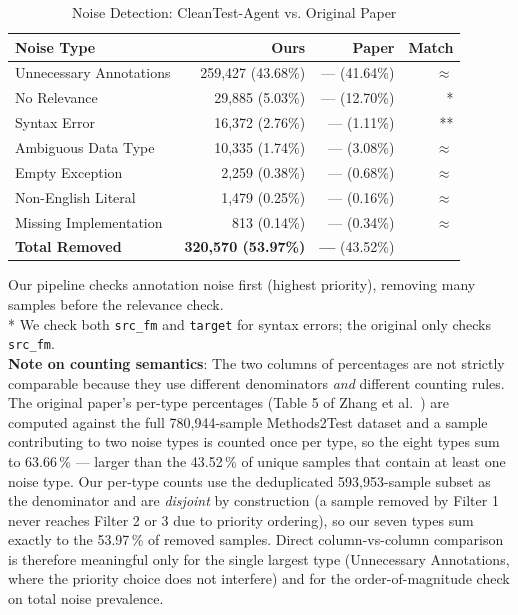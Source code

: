 \documentclass[acmlarge,nonacm,screen]{acmart}
\begin{document}
\begin{table}[H]
\caption{Noise Detection: CleanTest-Agent vs. Original Paper}
\label{tab:rq1}
\begin{tabular}{@{}lrrr@{}}
\toprule
\textbf{Noise Type} & \textbf{Ours} & \textbf{Paper} & \textbf{Match} \\
\midrule
Unnecessary Annotations & 259,427 (43.68\%) & --- (41.64\%) & $\approx$ \\
No Relevance & 29,885 (5.03\%) & --- (12.70\%) & * \\
Syntax Error & 16,372 (2.76\%) & --- (1.11\%) & ** \\
Ambiguous Data Type & 10,335 (1.74\%) & --- (3.08\%) & $\approx$ \\
Empty Exception & 2,259 (0.38\%) & --- (0.68\%) & $\approx$ \\
Non-English Literal & 1,479 (0.25\%) & --- (0.16\%) & $\approx$ \\
Missing Implementation & 813 (0.14\%) & --- (0.34\%) & $\approx$ \\
\midrule
\textbf{Total Removed} & \textbf{320,570 (53.97\%)} & \textbf{---} (43.52\%) & \\
\bottomrule
\end{tabular}
\begin{flushleft}
\small * Our pipeline checks annotation noise first (highest priority), removing many samples before the relevance check.\\
\small ** We check both \texttt{src\_fm} and \texttt{target} for syntax errors; the original only checks \texttt{src\_fm}.\\
\small \textbf{Note on counting semantics}:
The two columns of percentages are not strictly comparable because
they use different denominators \emph{and} different counting rules.
The original paper's per-type percentages (Table 5 of Zhang et
al.~\cite{zhang2025cleantest}) are computed against the full
780{,}944-sample Methods2Test dataset and a sample contributing to
two noise types is counted once per type, so the eight types sum to
63.66\,\% --- larger than the 43.52\,\% of unique samples that
contain at least one noise type. Our per-type counts use the
deduplicated 593{,}953-sample subset as the denominator and are
\emph{disjoint} by construction (a sample removed by Filter 1
never reaches Filter 2 or 3 due to priority ordering), so our seven
types sum exactly to the 53.97\,\% of removed samples. Direct
column-vs-column comparison is therefore meaningful only for the
single largest type (Unnecessary Annotations, where the priority
choice does not interfere) and for the order-of-magnitude check on
total noise prevalence.
\end{flushleft}
\end{table}
\end{document}
